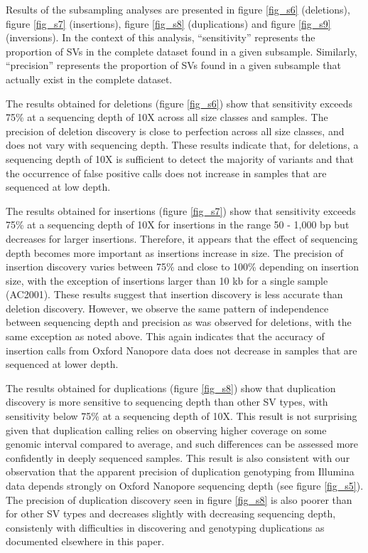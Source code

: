 \documentclass[12pt]{article}
\begin{document}
Results of the subsampling analyses are presented in figure \ref{fig_s6} (deletions), figure \ref{fig_s7} (insertions), figure \ref{fig_s8} (duplications) and figure \ref{fig_s9} (inversions).
In the context of this analysis, ``sensitivity'' represents the proportion of SVs in the complete dataset found in a given subsample.
Similarly, ``precision'' represents the proportion of SVs found in a given subsample that actually exist in the complete dataset.

The results obtained for deletions (figure \ref{fig_s6}) show that sensitivity exceeds 75\% at a sequencing depth of 10X across all size classes and samples.
The precision of deletion discovery is close to perfection across all size classes, and does not vary with sequencing depth.
These results indicate that, for deletions, a sequencing depth of 10X is sufficient to detect the majority of variants and that the occurrence of false positive calls does not increase in samples that are sequenced at low depth.

The results obtained for insertions (figure \ref{fig_s7}) show that sensitivity exceeds 75\% at a sequencing depth of 10X for insertions in the range 50 - 1,000 bp but decreases for larger insertions.
Therefore, it appears that the effect of sequencing depth becomes more important as insertions increase in size.
The precision of insertion discovery varies between 75\% and close to 100\% depending on insertion size, with the exception of insertions larger than 10 kb for a single sample (AC2001).
These results suggest that insertion discovery is less accurate than deletion discovery.
However, we observe the same pattern of independence between sequencing depth and precision as was observed for deletions, with the same exception as noted above.
This again indicates that the accuracy of insertion calls from Oxford Nanopore data does not decrease in samples that are sequenced at lower depth.

The results obtained for duplications (figure \ref{fig_s8}) show that duplication discovery is more sensitive to sequencing depth than other SV types, with sensitivity below 75\% at a sequencing depth of 10X.
This result is not surprising given that duplication calling relies on observing higher coverage on some genomic interval compared to average, and such differences can be assessed more confidently in deeply sequenced samples.
This result is also consistent with our observation that the apparent precision of duplication genotyping from Illumina data depends strongly on Oxford Nanopore sequencing depth (see figure \ref{fig_s5}).
The precision of duplication discovery seen in figure \ref{fig_s8} is also poorer than for other SV types and decreases slightly with decreasing sequencing depth, consistenly with difficulties in discovering and genotyping duplications as documented elsewhere in this paper.
\end{document}
